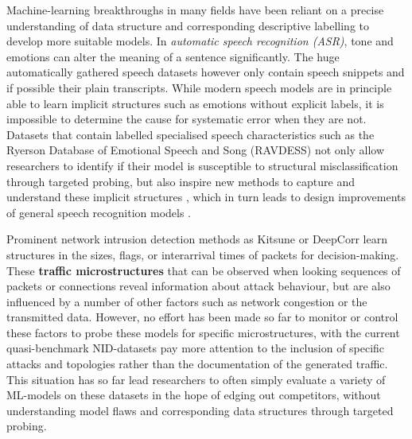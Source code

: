 \documentclass[runningheads]{llncs}
\begin{document}
Machine-learning breakthroughs in many fields have been reliant on a precise understanding of data structure and corresponding descriptive labelling to develop more suitable models.
In \textit{automatic speech recognition (ASR)}, tone and emotions can alter the meaning of a sentence significantly. The huge automatically gathered speech datasets however only contain speech snippets and if possible their plain transcripts. While modern speech models are in principle able to learn implicit structures such as emotions without explicit labels, it is impossible to determine the cause for systematic error when they are not. Datasets that contain labelled specialised speech characteristics such as the Ryerson Database of Emotional Speech and Song (RAVDESS) \cite{livingstone2018ryerson} not only allow researchers to identify if their model is susceptible to structural misclassification through targeted probing, but also inspire new methods to capture and understand these implicit structures \cite{haque2019audio}, which in turn leads to design improvements of general speech recognition models \cite{kamper2020multilingual}.



Prominent network intrusion detection methods as Kitsune \cite{mirsky2018kitsune} or DeepCorr \cite{nasr2018deepcorr} learn structures in the sizes, flags, or interarrival times of packets for decision-making. These \textbf{traffic microstructures} that can be observed when looking sequences of packets or connections reveal information about attack behaviour, but are also influenced by a number of other factors such as network congestion or the transmitted data. However, no effort has been made so far to monitor or control these factors to probe these models for specific microstructures, with the current quasi-benchmark NID-datasets pay more attention to the inclusion of specific attacks and topologies rather than the documentation of the generated traffic. 
This situation has so far lead researchers to often simply evaluate a variety of ML-models on these datasets in the hope of edging out competitors, without understanding model flaws and corresponding data structures through targeted probing.
\end{document}
